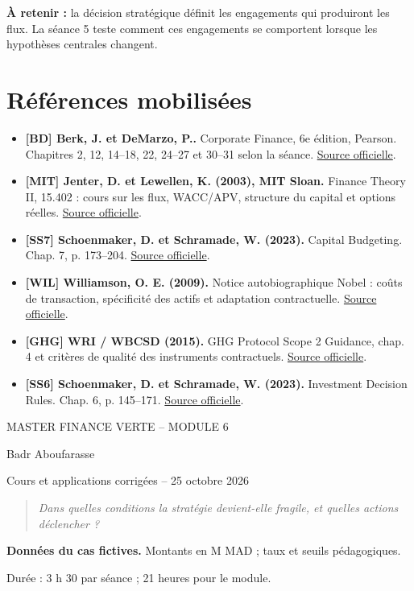 \documentclass[12pt,a4paper]{article}
\begin{document}
\textbf{À retenir :} la décision stratégique définit les engagements qui produiront les flux. La séance 5 teste comment ces engagements se comportent lorsque les hypothèses centrales changent.

\section*{Références mobilisées}
\small
\begin{itemize}
\item \textbf{[BD] Berk, J. et DeMarzo, P..} Corporate Finance, 6e édition, Pearson. Chapitres 2, 12, 14--18, 22, 24--27 et 30--31 selon la séance. \href{https://www.pearson.com/en-us/subject-catalog/p/corporate-finance/P200000009791/9780137844906}{Source officielle}.
\item \textbf{[MIT] Jenter, D. et Lewellen, K. (2003), MIT Sloan.} Finance Theory II, 15.402 : cours sur les flux, WACC/APV, structure du capital et options réelles. \href{https://ocw.mit.edu/courses/15-402-finance-theory-ii-spring-2003/pages/lecture-notes/}{Source officielle}.
\item \textbf{[SS7] Schoenmaker, D. et Schramade, W. (2023).} Capital Budgeting. Chap. 7, p. 173--204. \href{https://doi.org/10.1007/978-3-031-35009-2_7}{Source officielle}.
\item \textbf{[WIL] Williamson, O. E. (2009).} Notice autobiographique Nobel : coûts de transaction, spécificité des actifs et adaptation contractuelle. \href{https://www.nobelprize.org/prizes/economic-sciences/2009/williamson/biographical/}{Source officielle}.
\item \textbf{[GHG] WRI / WBCSD (2015).} GHG Protocol Scope 2 Guidance, chap. 4 et critères de qualité des instruments contractuels. \href{https://ghgprotocol.org/sites/default/files/2023-03/Scope\%202\%20Guidance.pdf}{Source officielle}.
\item \textbf{[SS6] Schoenmaker, D. et Schramade, W. (2023).} Investment Decision Rules. Chap. 6, p. 145--171. \href{https://doi.org/10.1007/978-3-031-35009-2_6}{Source officielle}.
\end{itemize}\normalsize
\clearpage
\begin{center}{\small MASTER FINANCE VERTE -- MODULE 6}\par\vspace{8pt}{\Large\bfseries Séance 5 -- Résistance financière et décisions adaptatives}\par\vspace{6pt}Badr Aboufarasse\par{\small Cours et applications corrigées -- 25 octobre 2026}\end{center}
\begin{quote}\itshape Dans quelles conditions la stratégie devient-elle fragile, et quelles actions déclencher ?\end{quote}
\textbf{Données du cas fictives.} Montants en M MAD ; taux et seuils pédagogiques.\par Durée : 3 h 30 par séance ; 21 heures pour le module.
\end{document}

